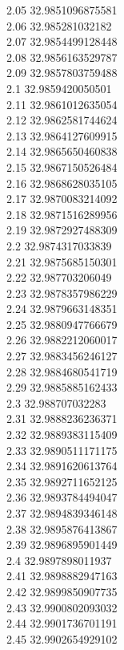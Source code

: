 {2.05	32.9851096875581\\
2.06	32.985281032182\\
2.07	32.9854499128448\\
2.08	32.9856163529787\\
2.09	32.9857803759488\\
2.1	32.9859420050501\\
2.11	32.9861012635054\\
2.12	32.9862581744624\\
2.13	32.9864127609915\\
2.14	32.9865650460838\\
2.15	32.9867150526484\\
2.16	32.9868628035105\\
2.17	32.9870083214092\\
2.18	32.9871516289956\\
2.19	32.9872927488309\\
2.2	32.9874317033839\\
2.21	32.9875685150301\\
2.22	32.987703206049\\
2.23	32.9878357986229\\
2.24	32.9879663148351\\
2.25	32.9880947766679\\
2.26	32.9882212060017\\
2.27	32.9883456246127\\
2.28	32.9884680541719\\
2.29	32.9885885162433\\
2.3	32.988707032283\\
2.31	32.9888236236371\\
2.32	32.9889383115409\\
2.33	32.9890511171175\\
2.34	32.9891620613764\\
2.35	32.9892711652125\\
2.36	32.9893784494047\\
2.37	32.9894839346148\\
2.38	32.9895876413867\\
2.39	32.9896895901449\\
2.4	32.9897898011937\\
2.41	32.9898882947163\\
2.42	32.9899850907735\\
2.43	32.9900802093032\\
2.44	32.9901736701191\\
2.45	32.9902654929102\\
}

